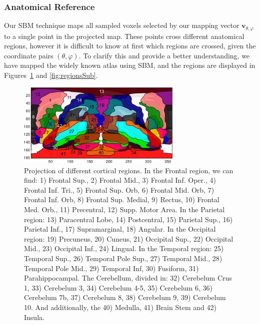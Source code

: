 \subsubsection{Anatomical Reference}\label{sec:anatomical}
Our \ac{SBM} technique maps all sampled voxels selected by our mapping vector $\mathbf{v}_{\theta,\varphi}$ to a single point in the projected map. These points cross different anatomical regions, however it is difficult to know at first which regions are crossed, given the coordinate pairs $(\theta,\varphi)$. To clarify this and provide a better understanding, we have mapped the widely known \cite{AAL} atlas \cite{Tzourio-Mazoyer2002} using \ac{SBM}, and the regions are displayed in Figures~\ref{fig:regionsCort} and \ref{fig:regionsSub}. 

\begin{figure}[htp]
	\centering
	\includegraphics[width=0.7\textwidth]{Graphics/ch6/05-regions_cortical}
	
	\caption{Projection of different cortical regions. In the Frontal region, we can find: 1) Frontal Sup., 2) Frontal Mid., 3) Frontal Inf. Oper., 4) Frontal Inf. Tri., 5) Frontal Sup. Orb, 6) Frontal Mid. Orb, 7) Frontal Inf. Orb, 8) Frontal Sup. Medial, 9) Rectus, 10) Frontal Med. Orb., 11) Precentral, 12) Supp. Motor Area. In the Parietal region: 13) Paracentral Lobe, 14) Postcentral, 15) Parietal Sup., 16) Parietal Inf., 17) Supramarginal, 18) Angular. In the Occipital region: 19) Precuneus, 20) Cuneus, 21) Occipital Sup., 22) Occipital Mid., 23) Occipital Inf., 24) Lingual. In the Temporal region: 25) Temporal Sup., 26) Temporal Pole Sup., 27) Temporal Mid., 28) Temporal Pole Mid., 29) Temporal Inf, 30) Fusiform, 31) Parahippocampal. The Cerebellum, divided in: 32) Cerebelum Crus 1, 33) Cerebelum 3, 34) Cerebelum 4-5, 35) Cerebelum 6, 36) Cerebelum 7b, 37) Cerebelum 8, 38) Cerebelum 9, 39) Cerebelum 10. And additionally, the 40) Medulla, 41) Brain Stem and 42) Insula.}
	\label{fig:regionsCort}
\end{figure}

